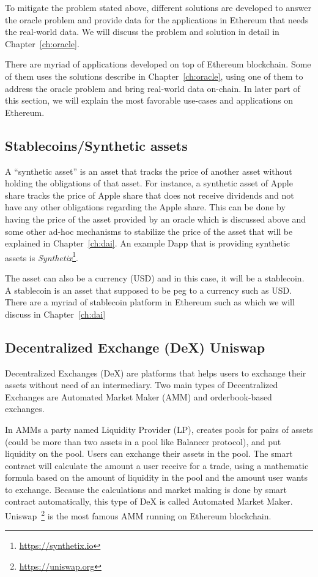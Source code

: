 To mitigate the problem stated above, different solutions are developed to answer the oracle problem and provide data for the applications in Ethereum that needs the real-world data. We will discuss the problem and solution in detail in Chapter~\ref{ch:oracle}.

There are myriad of applications developed on top of Ethereum blockchain. Some of them uses the solutions describe in  Chapter~\ref{ch:oracle}, using one of them to address the oracle problem and bring real-world data on-chain. In later part of this section, we will explain the most favorable use-cases and applications on Ethereum.

\subsection{Stablecoins/Synthetic assets \eg \dai}

A ``synthetic asset'' is an asset that tracks the price of another asset without holding the obligations of that asset. For instance, a synthetic asset of Apple share tracks the price of Apple share that does not receive dividends and not have any other obligations regarding the Apple share. This can be done by having the price of the asset provided by an oracle which is discussed above and some other ad-hoc mechanisms to stabilize the price of the asset that will be explained in Chapter~\ref{ch:dai}. An example Dapp that is providing synthetic assets is \textit{Synthetix}\footnote{\url{https://synthetix.io}}.

The asset can also be a currency (\eg USD) and in this case, it will be a stablecoin. A stablecoin is an asset that supposed to be peg to a currency such as USD. There are a myriad of stablecoin platform in Ethereum such as \dai which we will discuss in Chapter~\ref{ch:dai}

\subsection{Decentralized Exchange (DeX) \eg Uniswap}
Decentralized Exchanges (DeX) are platforms that helps users to exchange their assets without need of an intermediary. Two main types of Decentralized Exchanges are Automated Market Maker (AMM) and orderbook-based exchanges. 

In AMMs a party named Liquidity Provider (LP), creates pools for pairs of assets (could be more than two assets in a pool like Balancer protocol), and put liquidity on the pool. Users can exchange their assets in the pool. The smart contract will calculate the amount a user receive for a trade, using a mathematic formula based on the amount of liquidity in the pool and the amount user wants to exchange. Because the calculations and market making is done by smart contract automatically, this type of DeX is called Automated Market Maker. Uniswap~\footnote{\url{https://uniswap.org}} is the most famous AMM running on Ethereum blockchain.

